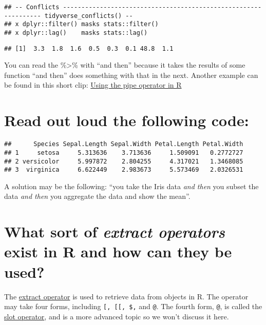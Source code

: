 \documentclass[
]{article}
\begin{document}
\begin{verbatim}
## -- Conflicts ---------------------------------------------------------------- tidyverse_conflicts() --
## x dplyr::filter() masks stats::filter()
## x dplyr::lag()    masks stats::lag()
\end{verbatim}

\begin{verbatim}
## [1]  3.3  1.8  1.6  0.5  0.3  0.1 48.8  1.1
\end{verbatim}

You can read the \%\textgreater\% with ``and then'' because it takes the
results of some function ``and then'' does something with that in the
next. Another example can be found in this short clip:
\href{https://youtu.be/PX5NuteZ3Vg}{Using the pipe operator in R}

\hypertarget{read-out-loud-the-following-code}{%
\section{Read out loud the following
code:}\label{read-out-loud-the-following-code}}

\begin{verbatim}
##      Species Sepal.Length Sepal.Width Petal.Length Petal.Width
## 1     setosa     5.313636    3.713636     1.509091   0.2772727
## 2 versicolor     5.997872    2.804255     4.317021   1.3468085
## 3  virginica     6.622449    2.983673     5.573469   2.0326531
\end{verbatim}

A solution may be the following: ``you take the Iris data \emph{and
then} you subset the data \emph{and then} you aggregate the data and
show the mean''.

\hypertarget{what-sort-of-extract-operators-exist-in-r-and-how-can-they-be-used}{%
\section{\texorpdfstring{What sort of \emph{extract operators} exist in
R and how can they be
used?}{What sort of extract operators exist in R and how can they be used?}}\label{what-sort-of-extract-operators-exist-in-r-and-how-can-they-be-used}}

The
\href{https://stat.ethz.ch/R-manual/R-devel/library/base/html/Extract.html}{extract
operator} is used to retrieve data from objects in R. The operator may
take four forms, including \texttt{{[},\ {[}{[},\ \$,} and \texttt{@}.
The fourth form, \texttt{@}, is called the
\href{https://stat.ethz.ch/R-manual/R-devel/library/methods/html/slot.html}{slot
operator}, and is a more advanced topic so we won't discuss it here.
\end{document}
